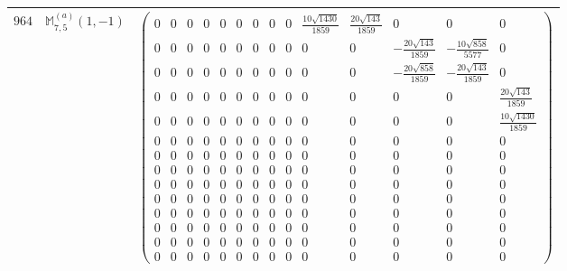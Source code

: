 \documentclass[fleqn,8pt,landscape]{jsarticle}
\begin{document}
\begin{center}
\begin{longtable}{ccc}
$ 964 $ & $ \mathbb{M}_{7,5}^{(a)}(1,-1) $ & $ \begin{pmatrix} 0 & 0 & 0 & 0 & 0 & 0 & 0 & 0 & 0 & \frac{10 \sqrt{1430}}{1859} & \frac{20 \sqrt{143}}{1859} & 0 & 0 & 0 \\ 0 & 0 & 0 & 0 & 0 & 0 & 0 & 0 & 0 & 0 & 0 & - \frac{20 \sqrt{143}}{1859} & - \frac{10 \sqrt{858}}{5577} & 0 \\ 0 & 0 & 0 & 0 & 0 & 0 & 0 & 0 & 0 & 0 & 0 & - \frac{20 \sqrt{858}}{1859} & - \frac{20 \sqrt{143}}{1859} & 0 \\ 0 & 0 & 0 & 0 & 0 & 0 & 0 & 0 & 0 & 0 & 0 & 0 & 0 & \frac{20 \sqrt{143}}{1859} \\ 0 & 0 & 0 & 0 & 0 & 0 & 0 & 0 & 0 & 0 & 0 & 0 & 0 & \frac{10 \sqrt{1430}}{1859} \\ 0 & 0 & 0 & 0 & 0 & 0 & 0 & 0 & 0 & 0 & 0 & 0 & 0 & 0 \\ 0 & 0 & 0 & 0 & 0 & 0 & 0 & 0 & 0 & 0 & 0 & 0 & 0 & 0 \\ 0 & 0 & 0 & 0 & 0 & 0 & 0 & 0 & 0 & 0 & 0 & 0 & 0 & 0 \\ 0 & 0 & 0 & 0 & 0 & 0 & 0 & 0 & 0 & 0 & 0 & 0 & 0 & 0 \\ 0 & 0 & 0 & 0 & 0 & 0 & 0 & 0 & 0 & 0 & 0 & 0 & 0 & 0 \\ 0 & 0 & 0 & 0 & 0 & 0 & 0 & 0 & 0 & 0 & 0 & 0 & 0 & 0 \\ 0 & 0 & 0 & 0 & 0 & 0 & 0 & 0 & 0 & 0 & 0 & 0 & 0 & 0 \\ 0 & 0 & 0 & 0 & 0 & 0 & 0 & 0 & 0 & 0 & 0 & 0 & 0 & 0 \\ 0 & 0 & 0 & 0 & 0 & 0 & 0 & 0 & 0 & 0 & 0 & 0 & 0 & 0 \end{pmatrix} $ \\ \hline

\end{longtable}
\end{center}
\end{document}

